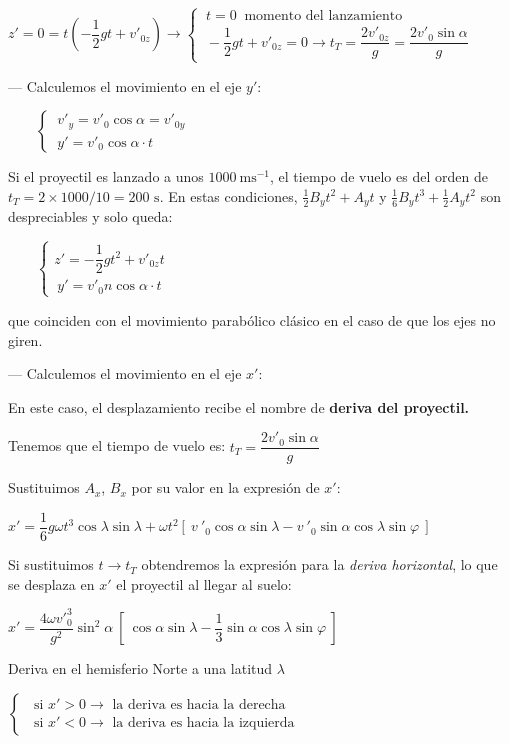 $z'=0 =t\left( -\dfrac 1 2 gt + v'_{0z} \right) \to \begin{cases}
 \ t=0  \ \text{ momento del lanzamiento}\\ \  -\dfrac 1 2 gt + v'_{0z} =0 \to t_T=\dfrac{2v'_{0z}}{g}=\dfrac{2v'_0\sin \alpha}{g}
 \end{cases}$

--- Calculemos el movimiento en el eje $y'$:

$\qquad \begin{cases}
\ v'_y=v'_0 \cos \alpha=v'_{0y} \\ \ y'=v'_0 \cos \alpha \cdot t	
\end{cases}$

Si el proyectil es lanzado a unos $1000\ \text{ms}^{-1}$, el tiempo de vuelo es del orden de $t_T=2 \times  1000 / 10 =200 \text{ s}$. En estas condiciones, $\frac 1 2 B_y t^2+ A_y t$ y $\frac 1 6 B_y t^3+\frac 1 2 A_y t^2$ son despreciables y solo queda:

$\qquad \begin{cases}
z'=-\dfrac 1 2 g t^2+v'_{0z}t \\ \ y'=v'_0n\cos \alpha \cdot t	
\end{cases}\ $ 

que coinciden con el movimiento parabólico clásico en el caso de que los ejes no giren.

--- Calculemos el movimiento en el eje $x'$:

En este caso, el desplazamiento recibe el nombre de \textbf{deriva del proyectil.}

Tenemos que el tiempo de vuelo es:  $t_T=\dfrac{2v'_0\sin \alpha}{g}$

Sustituimos $A_x$, $B_x$ por su valor en la expresión de $x'$:

$x'=\dfrac 1 6 g\omega t^3 \cos \lambda \sin \lambda + \omega t^2 [\ v\ '_0 \cos \alpha \sin \lambda -v\ '_0 \sin \alpha \cos \lambda \sin \varphi  \ ]$

Si sustituimos $t\to t_T$ obtendremos la expresión para la \emph{deriva horizontal}, lo que se desplaza en $x'$ el proyectil al llegar al suelo:

$x'= \dfrac {4 \omega {v'}_0^3}{g^2} \sin^2 \alpha \  \left[ \ \cos \alpha \sin \lambda-\dfrac 1 3 \sin \alpha \cos \lambda \sin \varphi \ \right]$

Deriva en el hemisferio Norte a una latitud $\lambda$

$\begin{cases}
\ \text{ si } x'>0 \to \text{ la deriva es hacia la derecha} \\	
\ \text{ si } x'<0 \to \text{ la deriva es hacia la izquierda}
\end{cases}$

